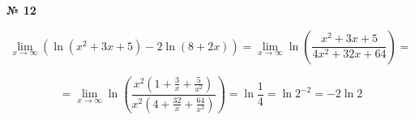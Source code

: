 \documentclass{article}
\begin{document}
\textbf{№ 12}

$$ \lim_{x\to\infty} \left( \ln(x^2+3x+5) - 2\ln(8+2x) \right) 
= \lim_{x\to\infty} \ln \left( \frac{x^2+3x+5}{4x^2+32x+64} \right) = $$

$$ = \lim_{x\to\infty} \ln \left( \frac{x^2(1 + \frac{3}{x} + \frac{5}{x^2})}{x^2(4 + \frac{32}{x} + \frac{64}{x^2})} \right) 
= \ln \frac{1}{4} 
= \ln 2^{-2} 
= -2\ln 2 $$
\end{document}
